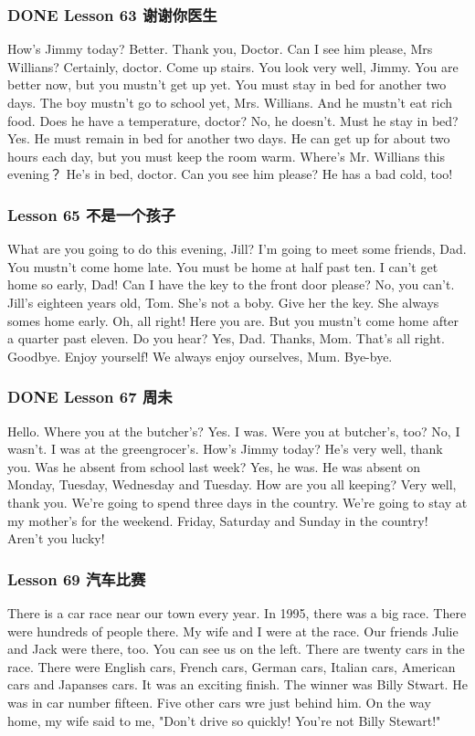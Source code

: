 \documentclass[11pt]{ctexart}
\begin{document}
\subsubsection{{\bfseries\sffamily DONE} Lesson 63 谢谢你医生}
\label{sec:org5ddf551}
How's Jimmy today?
Better. Thank you, Doctor.
Can I see him please, Mrs Willians?
Certainly, doctor.
Come up stairs.
You look very well, Jimmy.
You are better now,
but you mustn't get up yet.
You must stay in bed for another two days.
The boy mustn't go to school yet, Mrs. Willians.
And he mustn't eat rich food.
Does he have a temperature, doctor?
No, he doesn't.
Must he stay in bed?
Yes. He must remain in bed for another two days.
He can get up for about two hours each day,
but you must keep the room warm.
Where's Mr. Willians this evening？
He's in bed, doctor.
Can you see him please?
He has a bad cold, too!
\subsubsection{Lesson 65 不是一个孩子}
\label{sec:org8d4addc}
What are you going to do this evening, Jill?
I'm going to meet some friends, Dad.
You mustn't come home late.
You must be home at half past ten.
I can't get home so early, Dad!
Can I have the key to the front door please?
No, you can't.
Jill's eighteen years old, Tom.
She's not a boby.
Give her the key.
She always somes home early.
Oh, all right!
Here you are.
But you mustn't come home after a quarter past eleven.
Do you hear?
Yes, Dad.
Thanks, Mom.
That's all right. Goodbye.
Enjoy yourself!
We always enjoy ourselves, Mum.
Bye-bye.
\subsubsection{{\bfseries\sffamily DONE} Lesson 67 周未}
\label{sec:orga80484e}
Hello. Where you at the butcher's?
Yes. I was.
Were you at butcher's, too?
No, I wasn't.
I was at the greengrocer's.
How's Jimmy today? He's very well, thank you.
Was he absent from school last week?
Yes, he was.
He was absent on Monday, Tuesday, Wednesday and Tuesday.
How are you all keeping?
Very well, thank you.
We're going to spend three days in the country.
We're going to stay at my mother's for the weekend.
Friday, Saturday and Sunday in the country!
Aren't you lucky!
\subsubsection{Lesson 69 汽车比赛}
\label{sec:orgfac6fac}
There is a car race near our town every year.
In 1995, there was a big race.
There were hundreds of people there.
My wife and I were at the race.
Our friends Julie and Jack were there, too.
You can see us on the left.
There are twenty cars in the race.
There were English cars, French cars, German cars, Italian cars, American cars and Japanses cars.
It was an exciting finish.
The winner was Billy Stwart.
He was in car number fifteen.
Five other cars wre just behind him.
On the way home, my wife said to me,
"Don't drive so quickly! You're not Billy Stewart!"
\end{document}
